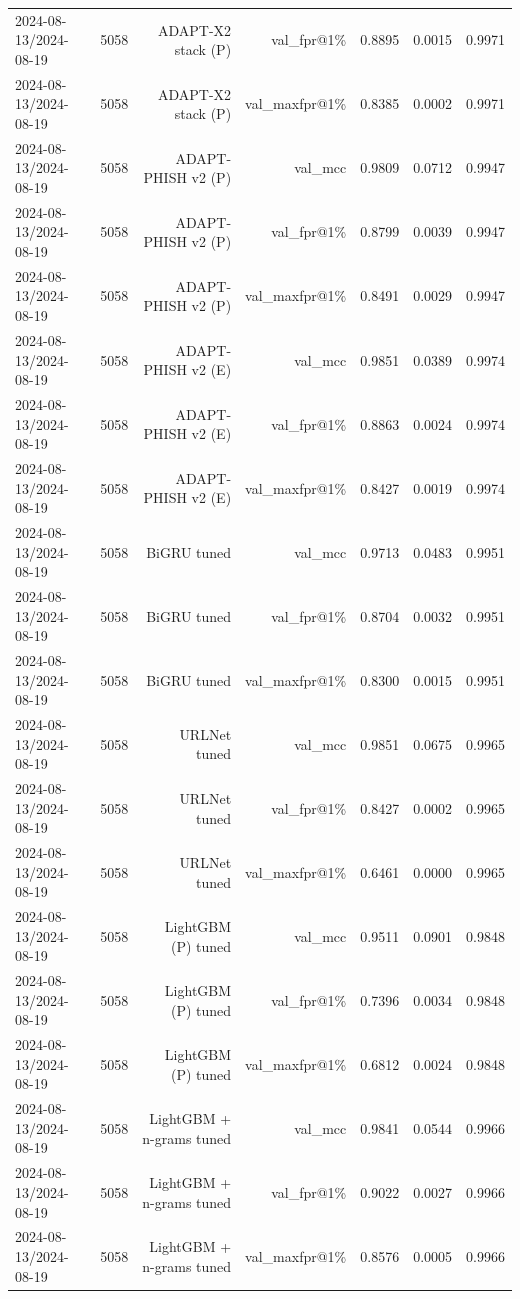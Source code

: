 \begin{table}[t]
\begin{tabular}{llrrrrr}
2024-08-13/2024-08-19 & 5058 & ADAPT-X2 stack (P) & val\_fpr@1\% & 0.8895 & 0.0015 & 0.9971 \\
2024-08-13/2024-08-19 & 5058 & ADAPT-X2 stack (P) & val\_maxfpr@1\% & 0.8385 & 0.0002 & 0.9971 \\
2024-08-13/2024-08-19 & 5058 & ADAPT-PHISH v2 (P) & val\_mcc & 0.9809 & 0.0712 & 0.9947 \\
2024-08-13/2024-08-19 & 5058 & ADAPT-PHISH v2 (P) & val\_fpr@1\% & 0.8799 & 0.0039 & 0.9947 \\
2024-08-13/2024-08-19 & 5058 & ADAPT-PHISH v2 (P) & val\_maxfpr@1\% & 0.8491 & 0.0029 & 0.9947 \\
2024-08-13/2024-08-19 & 5058 & ADAPT-PHISH v2 (E) & val\_mcc & 0.9851 & 0.0389 & 0.9974 \\
2024-08-13/2024-08-19 & 5058 & ADAPT-PHISH v2 (E) & val\_fpr@1\% & 0.8863 & 0.0024 & 0.9974 \\
2024-08-13/2024-08-19 & 5058 & ADAPT-PHISH v2 (E) & val\_maxfpr@1\% & 0.8427 & 0.0019 & 0.9974 \\
2024-08-13/2024-08-19 & 5058 & BiGRU tuned & val\_mcc & 0.9713 & 0.0483 & 0.9951 \\
2024-08-13/2024-08-19 & 5058 & BiGRU tuned & val\_fpr@1\% & 0.8704 & 0.0032 & 0.9951 \\
2024-08-13/2024-08-19 & 5058 & BiGRU tuned & val\_maxfpr@1\% & 0.8300 & 0.0015 & 0.9951 \\
2024-08-13/2024-08-19 & 5058 & URLNet tuned & val\_mcc & 0.9851 & 0.0675 & 0.9965 \\
2024-08-13/2024-08-19 & 5058 & URLNet tuned & val\_fpr@1\% & 0.8427 & 0.0002 & 0.9965 \\
2024-08-13/2024-08-19 & 5058 & URLNet tuned & val\_maxfpr@1\% & 0.6461 & 0.0000 & 0.9965 \\
2024-08-13/2024-08-19 & 5058 & LightGBM (P) tuned & val\_mcc & 0.9511 & 0.0901 & 0.9848 \\
2024-08-13/2024-08-19 & 5058 & LightGBM (P) tuned & val\_fpr@1\% & 0.7396 & 0.0034 & 0.9848 \\
2024-08-13/2024-08-19 & 5058 & LightGBM (P) tuned & val\_maxfpr@1\% & 0.6812 & 0.0024 & 0.9848 \\
2024-08-13/2024-08-19 & 5058 & LightGBM + n-grams tuned & val\_mcc & 0.9841 & 0.0544 & 0.9966 \\
2024-08-13/2024-08-19 & 5058 & LightGBM + n-grams tuned & val\_fpr@1\% & 0.9022 & 0.0027 & 0.9966 \\
2024-08-13/2024-08-19 & 5058 & LightGBM + n-grams tuned & val\_maxfpr@1\% & 0.8576 & 0.0005 & 0.9966 \\

\end{tabular}
\end{table}
